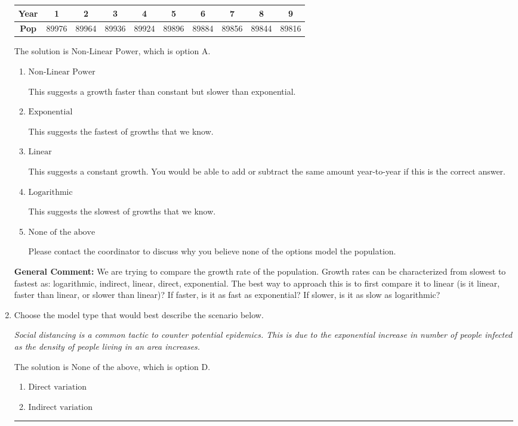 \documentclass{extbook}[14pt]
\newcommand{\litem}[1]{\item #1

\rule{\textwidth}{0.4pt}}
\begin{document}
\begin{enumerate}
{\begin{tabular}{c|c|c|c|c|c|c|c|c|c}
\textbf{Year} &1 &2 &3 &4 &5 &6 &7 &8 &9\tabularnewline \hline
\textbf{Pop} &89976 &89964 &89936 &89924 &89896 &89884 &89856 &89844 &89816\end{tabular}The solution is \( \text{Non-Linear Power} \), which is option A.\begin{enumerate}[label=\Alph*.]
\item \( \text{Non-Linear Power} \)

This suggests a growth faster than constant but slower than exponential.
\item \( \text{Exponential} \)

This suggests the fastest of growths that we know.
\item \( \text{Linear} \)

This suggests a constant growth. You would be able to add or subtract the same amount year-to-year if this is the correct answer.
\item \( \text{Logarithmic} \)

This suggests the slowest of growths that we know.
\item \( \text{None of the above} \)

Please contact the coordinator to discuss why you believe none of the options model the population.
\end{enumerate}

\textbf{General Comment:} We are trying to compare the growth rate of the population. Growth rates can be characterized from slowest to fastest as: logarithmic, indirect, linear, direct, exponential. The best way to approach this is to first compare it to linear (is it linear, faster than linear, or slower than linear)? If faster, is it as fast as exponential? If slower, is it as slow as logarithmic?
}
\litem{
Choose the model type that would best describe the scenario below.

\begin{center}
    \textit{ Social distancing is a common tactic to counter potential epidemics. This is due to the exponential increase in number of people infected as the density of people living in an area increases. }
\end{center}
The solution is \( \text{None of the above} \), which is option D.\begin{enumerate}[label=\Alph*.]
\item \( \text{Direct variation} \)


\item \( \text{Indirect variation} \)



\end{enumerate}}
\end{enumerate}
\end{document}
